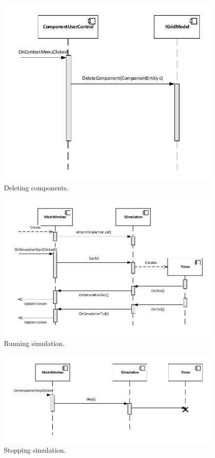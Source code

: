 \begin{figure}[!ht]
	\centering
	\includegraphics{figures/DeleteComponent}
	\caption{Deleting components.}
\end{figure}

\begin{figure}[!ht]
	\centering
	\includegraphics{figures/RunningSimulation}
	\caption{Running simulation.}
\end{figure}

\begin{figure}[!ht]
	\centering
	\includegraphics{figures/Stopping}
	\caption{Stopping simulation.}
\end{figure}


